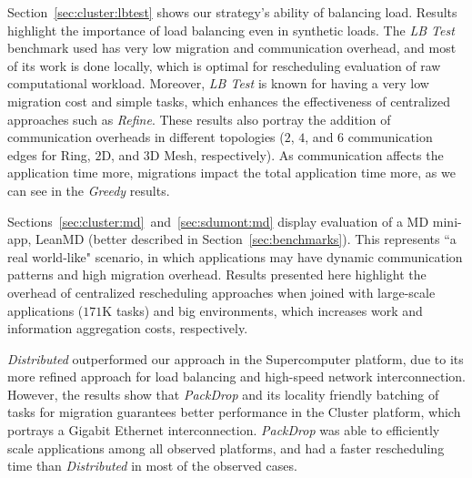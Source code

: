 Section~\ref{sec:cluster:lbtest} shows our strategy's ability of balancing load. 
Results highlight the importance of load balancing even in synthetic loads.
The \textit{LB Test} benchmark used has very low migration and communication overhead, and most of its work is done locally, which is optimal for rescheduling evaluation of raw computational workload.
Moreover, \textit{LB Test} is known for having a very low migration cost and simple tasks, which enhances the effectiveness of centralized approaches such as \textit{Refine}.
These results also portray the addition of communication overheads in different topologies ($2$, $4$, and $6$ communication edges for Ring, $2$D, and $3$D Mesh, respectively). %
As communication affects the application time more, migrations impact the total application time more, as we can see in the \textit{Greedy} results.


Sections~\ref{sec:cluster:md}~and~\ref{sec:sdumont:md} display evaluation of a MD mini-app, LeanMD (better described in Section~\ref{sec:benchmarks}).
This represents ``a real world-like" scenario, in which applications may have dynamic communication patterns and high migration overhead.
Results presented here highlight the overhead of centralized rescheduling approaches when joined with large-scale applications ($171$K tasks) and big environments, which increases work and information aggregation costs, respectively.

\textit{Distributed} outperformed our approach in the Supercomputer platform, due to its more refined approach for load balancing and high-speed network interconnection.
However, the results show that \textit{PackDrop} and its locality friendly batching of tasks for migration guarantees better performance in the Cluster platform, which portrays a Gigabit Ethernet interconnection.
\textit{PackDrop} was able to efficiently scale applications among all observed platforms, and had a faster rescheduling time than \textit{Distributed} in most of the observed cases.
